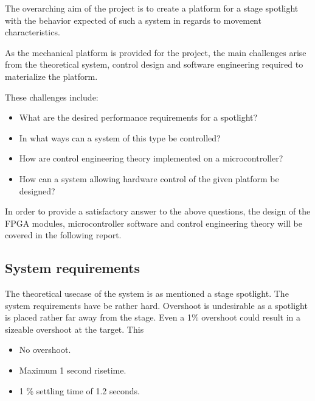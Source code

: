\documentclass[../../main]{subfiles}
\begin{document}
The overarching aim of the project is to create a platform for a stage spotlight with the behavior expected of such a system in regards to movement characteristics.

As the mechanical platform is provided for the project, the main challenges arise from the theoretical system, control design and software engineering required to materialize the platform.

These challenges include:

\begin{itemize}
    \item What are the desired performance requirements for a spotlight?
    \item In what ways can a system of this type be controlled?
    \item How are control engineering theory implemented on a microcontroller?
    \item How can a system allowing hardware control of the given platform be designed?
\end{itemize}

In order to provide a satisfactory answer to the above questions, the design of the FPGA modules, microcontroller software and control engineering theory will be covered in the following report.

\subsection{System requirements}

The theoretical usecase of the system is as mentioned a stage spotlight. The system requirements have be rather hard.
Overshoot is undesirable as a spotlight is placed rather far away from the stage. Even a 1\% overshoot could result in a sizeable overshoot at the target. This 

\begin{itemize}
  \item No overshoot.
  \item Maximum 1 second risetime.
  \item 1 \% settling time of 1.2 seconds.
\end{itemize}
\end{document}

